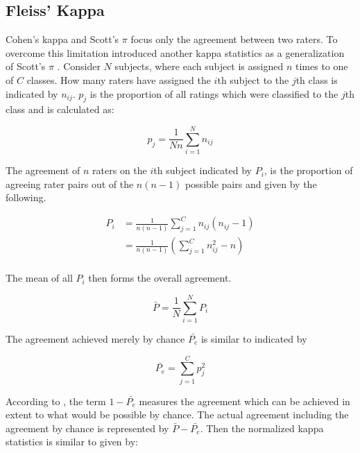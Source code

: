 \subsection{Fleiss' Kappa}
\label{chp:fundamentals:sec:inter_rater_agreement:subsec:fleiss_kappa}
Cohen's kappa and Scott's $\pi$ focus only the agreement between two raters.
To overcome this limitation \textcite{Fleiss:1971} introduced another kappa statistics as a generalization of Scott's $\pi$ \parencite{Scott:1955}.
Consider $N$ subjects, where each subject is assigned $n$ times to one of $C$ classes.
How many raters have assigned the $i$th subject to the $j$th class is indicated by $n_{ij}$.
$p_j$ is the proportion of all ratings which were classified to the $j$th class and is calculated as:

\begin{equation}\label{eq:fleiss_pj}
    p_j = \frac{1}{Nn}\sum_{i=1}^N n_{ij}
\end{equation}

The agreement of $n$ raters on the $i$th subject indicated by $P_i$, is the proportion of agreeing rater pairs out of the $n(n-1)$ possible pairs and given by the following.

\begin{equation}\label{eq:fleiss_Pi}
    \begin{aligned}
        P_i &= \frac{1}{n(n-1)} \sum_{j=1}^C n_{ij} (n_{ij}-1) \\
        &= \frac{1}{n(n-1)} (\sum_{j=1}^C n_{ij}^2 - n)\\
    \end{aligned}
\end{equation}

The mean of all $P_i$ then forms the overall agreement.

\begin{equation}\label{eq:fleiss_P_bar}
    \bar{P} = \frac{1}{N} \sum_{i=1}^N P_i
\end{equation}

The agreement achieved merely by chance $\bar{P_e}$ is similar to \textcite{Scott:1955} indicated by

\begin{equation}\label{eq:fleiss_P_e}
    \bar{P_e} = \sum_{j=1}^C p_j^2
\end{equation}

According to \textcite{Fleiss:1971}, the term $1-\bar{P_e}$ measures the agreement which can be achieved in extent to what would be possible by chance.
The actual agreement including the agreement by chance is represented by $\bar{P} - \bar{P_e}$.
Then the normalized kappa statistics is similar to \textcite{Cohen:1960} given by:

